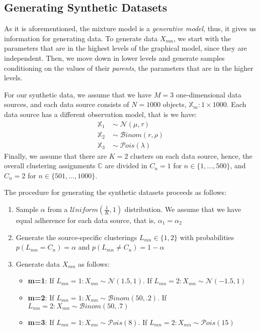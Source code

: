 \subsection{Generating Synthetic Datasets} \label{integr-synth-data-sect}
As it is aforementioned, the mixture model is a \emph{generative model}, thus, it gives us information for generating data. To generate data $X_{mn}$, we start with the parameters that are in the highest levels of the graphical model, since they are independent. Then, we move down in lower levels and generate samples conditioning on the values of their \emph{parents}, \ie the parameters that are in the higher levels. 

For our synthetic data, we assume that we have $M=3$ one-dimensional data sources, and each data source consists of $N=1000$ objects, \ie $\mathbb{X}_{m} : 1 \times 1000$. Each data source has a different observation model, that is we have:
\begin{equation*}
  \begin{aligned}
  	\mathbb{X}_{1} \; & \sim \; \mathcal{N}(\mu, \tau) \\
  	\mathbb{X}_{2} \; & \sim \; \mathcal{B}inom(r, \rho) \\
  	\mathbb{X}_{3} \; & \sim \; \mathcal{P}ois(\lambda)
  \end{aligned}
\end{equation*}
Finally, we assume that there are $K=2$ clusters on each data source, hence, the overall clustering assignments $\mathbb{C}$ are divided in $C_{n}=1$ for $n \in \lbrace 1,...,500 \rbrace$, and $C_{n}=2$ for $n \in \lbrace 501,...,1000 \rbrace$. 

The procedure for generating the synthetic datasets proceeds as follows:
\begin{enumerate}
	\item{
		Sample $\alpha$ from a $\mathcal{U}niform(\frac{1}{K}, 1)$ distribution. We assume that we have equal adherence for each data source, that is, $\alpha_{1} = \alpha_{2}$
	}
	\item{
		Generate the source-specific clusterings $L_{mn} \in \lbrace 1,2 \rbrace$ with probabilities $p(L_{mn} = C_{n}) = \alpha$ and $p(L_{mn} \neq C_{n}) = 1 - \alpha$
	}
	\item{
		Generate data $X_{mn}$ as follows:
		\begin{itemize}
			\item{
				\textbf{m=1}: If $L_{mn}=1 : X_{mn} \sim \mathcal{N}(1.5, 1)$. If $L_{mn}=2 : X_{mn} \sim \mathcal{N}(-1.5, 1)$
			}
			\item{ 
				\textbf{m=2}: If $L_{mn}=1 : X_{mn} \sim \mathcal{B}inom(50, .2)$. If $L_{mn}=2 : X_{mn} \sim \mathcal{B}inom(50, .7)$
			}
			\item{ 
				\textbf{m=3}: If $L_{mn}=1 : X_{mn} \sim \mathcal{P}ois(8)$. If $L_{mn}=2 : X_{mn} \sim \mathcal{P}ois(15)$
			}
		\end{itemize}	
	}
\end{enumerate}


